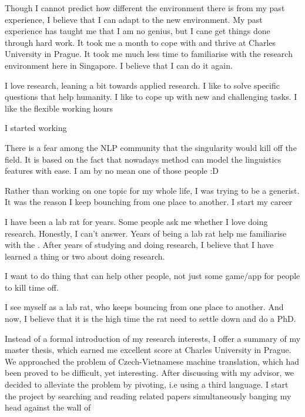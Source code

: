 \documentclass[a4paper, 12pt]{scrartcl}
\begin{document}
Though I cannot predict how different the environment there is from my past experience, I believe that I can adapt to the new environment. 
My past experience has taught me that I am no genius, but I cane get things done through hard work.
It took me a month to cope with and thrive at Charles University in Prague.
It took me much less time to familiarise with the research environment here in Singapore.
I believe that I can do it again. 


\newpage
I love research, leaning a bit towards applied research.
I like to solve specific questions that help humanity. 
I like to cope up with new and challenging tasks.
I like the flexible working hours
 

I started working 

There is a fear among the NLP community that the singularity would kill off the field. 
It is based on the fact that nowadays method can model the linguistics features with ease. 
I am by no mean one of those people :D




Rather than working on one topic for my whole life, I was trying to be a generist. 
It was the reason I keep bounching from one place to another. I start my career 

I have been a lab rat for years. 
Some people ask me whether I love doing research. Honestly, I can't answer. 
Years of being a lab rat help me familiarise with the .
After years of studying and doing research, I believe that I have learned a thing or two about doing research. 

I want to do thing that can help other people, not just some game/app for people to kill time off. 


I see myself as a lab rat, who keeps bouncing from one place to another. And now, I believe that it is the high time the rat need to settle down and do a PhD.



Instead of a formal introduction of my research interests, I offer a summary of my master thesis, which earned me excellent score at Charles University in Prague. 
We approached the problem of Czech-Vietnamese machine translation, which had been proved to be difficult, yet interesting.
After discussing with my advisor, we decided to alleviate the problem by pivoting, i.e using a third language. 
I start the project by searching and reading related papers simultaneously banging my head against the wall of 
\end{document}

